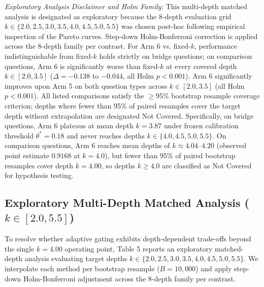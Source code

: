 \documentclass{article}
\begin{document}
\begin{table}[t]
\begin{flushleft}
\footnotesize \textit{Exploratory Analysis Disclaimer and Holm Family:} This multi-depth matched analysis is designated as exploratory because the 8-depth evaluation grid $k \in \{2.0, 2.5, 3.0, 3.5, 4.0, 4.5, 5.0, 5.5\}$ was chosen post-hoc following empirical inspection of the Pareto curves. Step-down Holm-Bonferroni correction is applied across the 8-depth family per contrast. For Arm 6 vs. fixed-$k$, performance indistinguishable from fixed-$k$ holds strictly on bridge questions; on comparison questions, Arm 6 is significantly worse than fixed-$k$ at every covered depth $k \in [2.0, 3.5]$ ($\Delta = -0.138$ to $-0.044$, all Holm $p < 0.001$). Arm 6 significantly improves upon Arm 5 on both question types across $k \in [2.0, 3.5]$ (all Holm $p < 0.001$). All listed comparisons satisfy the $\ge 95\%$ bootstrap resample coverage criterion; depths where fewer than 95\% of paired resamples cover the target depth without extrapolation are designated Not Covered. Specifically, on bridge questions, Arm 6 plateaus at mean depth $k=3.87$ under frozen calibration threshold $\theta^*=0.18$ and never reaches depths $k \in \{4.0, 4.5, 5.0, 5.5\}$. On comparison questions, Arm 6 reaches mean depths of $k \approx 4.04\text{--}4.20$ (observed point estimate $0.9168$ at $k=4.0$), but fewer than 95\% of paired bootstrap resamples cover depth $k=4.00$, so depths $k \ge 4.0$ are classified as Not Covered for hypothesis testing.
\end{flushleft}
\end{table}

\subsection{Exploratory Multi-Depth Matched Analysis ($k \in [2.0, 5.5]$)}
To resolve whether adaptive gating exhibits depth-dependent trade-offs beyond the single $k=4.00$ operating point, Table 5 reports an exploratory matched-depth analysis evaluating target depths $k \in \{2.0, 2.5, 3.0, 3.5, 4.0, 4.5, 5.0, 5.5\}$. We interpolate each method per bootstrap resample ($B=10{,}000$) and apply step-down Holm-Bonferroni adjustment across the 8-depth family per contrast.
\end{document}
